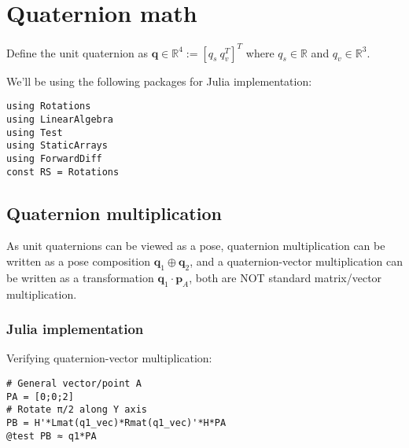 \section{Quaternion math}
Define the unit quaternion as $\textbf{q} \in \mathbb{R}^4 := [q_s\ q_v^T]^T$ where $q_s \in \mathbb{R}$ and $q_v \in \mathbb{R}^3$.

We'll be using the following packages for Julia implementation:
\begin{lstlisting}
using Rotations
using LinearAlgebra
using Test
using StaticArrays
using ForwardDiff
const RS = Rotations
\end{lstlisting}

\subsection{Quaternion multiplication}
As unit quaternions can be viewed as a pose, quaternion multiplication can be written as a pose composition $\textbf{q}_1 \oplus \textbf{q}_2$, and a quaternion-vector multiplication can be written as a transformation $\textbf{q}_1 \cdot \textbf{p}_A $, both are NOT standard matrix/vector multiplication.

\subsubsection{Julia implementation}

Verifying quaternion-vector multiplication:
\begin{lstlisting}
# General vector/point A
PA = [0;0;2]
# Rotate π/2 along Y axis
PB = H'*Lmat(q1_vec)*Rmat(q1_vec)'*H*PA
@test PB ≈ q1*PA
\end{lstlisting}


